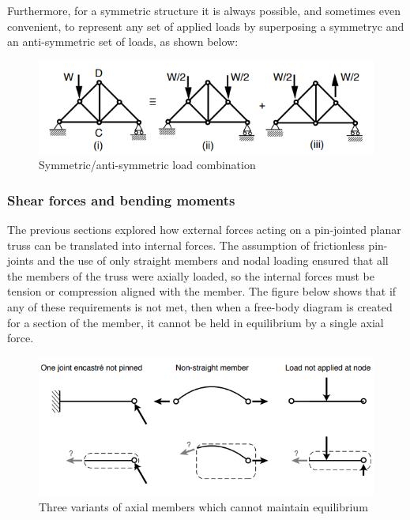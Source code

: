 \documentclass{article}
\begin{document}
Furthermore, for a symmetric structure it is always possible, and sometimes even convenient, to represent any set of applied loads by superposing a symmetryc and an anti-symmetric set of loads, as shown below:

\begin{figure}[h]
    \centering
    \includegraphics{images/symmetry2.png}
    \caption{Symmetric/anti-symmetric load combination}
    \label{fig:enter-label}
\end{figure}

\subsubsection{Shear forces and bending moments}

The previous sections explored how external forces acting on a pin-jointed planar truss can be translated into internal forces. The assumption of frictionless pin-joints and the use of only straight members and nodal loading ensured that all the members of the truss were axially loaded, so the internal forces must be tension or compression aligned with the member. The figure below shows that if any of these requirements is not met, then when a free-body diagram is created for a section of the member, it cannot be held in equilibrium by a single axial force.

\begin{figure}[h]
    \centering
    \includegraphics{images/shear1.png}
    \caption{Three variants of axial members which cannot maintain equilibrium}
    \label{fig:enter-label}
\end{figure}
\end{document}

